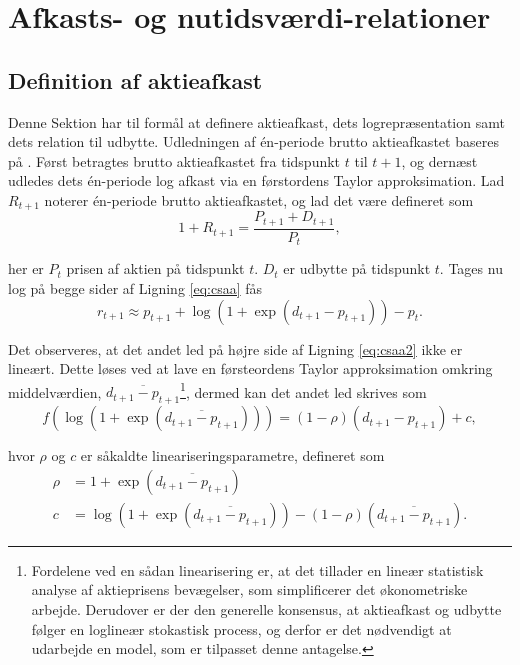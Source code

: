 \documentclass[
  a4paper,
  oneside]{memoir}
\begin{document}
\hypertarget{afkognut}{%
\section{Afkasts- og nutidsværdi-relationer}\label{afkognut}}

\hypertarget{defaktafk}{%
\subsection{Definition af aktieafkast}\label{defaktafk}}

Denne Sektion har til formål at definere aktieafkast, dets logrepræsentation samt dets relation til udbytte. Udledningen af én-periode brutto aktieafkastet baseres på \citep{Campbell1988}. Først betragtes brutto aktieafkastet fra tidspunkt \(t\) til \(t+1\), og dernæst udledes dets én-periode log afkast via en førstordens Taylor approksimation. Lad \(R_{t+1}\) noterer én-periode brutto aktieafkastet, og lad det være defineret som
\begin{equation}
1+R_{t+1}=\frac{P_{t+1}+D_{t+1}}{P_t}, \label{eq:csaa}
\end{equation}

her er \(P_t\) prisen af aktien på tidspunkt \(t\). \(D_t\) er udbytte på tidspunkt \(t\). Tages nu log på begge sider af Ligning \eqref{eq:csaa} fås
\begin{equation}
r_{t+1}\approx p_{t+1}+\log\left(1+\exp\left(d_{t+1}-p_{t+1}\right)\right)-p_t. \label{eq:csaa2}
\end{equation}

Det observeres, at det andet led på højre side af Ligning \eqref{eq:csaa2} ikke er lineært. Dette løses ved at lave en førsteordens Taylor approksimation omkring middelværdien, \(\overline{d_{t+1}-p_{t+1}}\)\footnote{Fordelene ved en sådan linearisering er, at det tillader en lineær statistisk analyse af aktieprisens bevægelser, som simplificerer det økonometriske arbejde. Derudover er der den generelle konsensus, at aktieafkast og udbytte følger en loglineær stokastisk process, og derfor er det nødvendigt at udarbejde en model, som er tilpasset denne antagelse.}, dermed kan det andet led skrives som
\begin{equation}
f\left(\log\left(1+\exp\left(\overline{d_{t+1}-p_{t+1}}\right)\right)\right) = (1-\rho)(d_{t+1}-p_{t+1}) + c, \label{eq:csaa3}
\end{equation}

hvor \(\rho\) og \(c\) er såkaldte lineariseringsparametre, defineret som
\begin{align*}
\rho&=1+\exp\left(\overline{d_{t+1}-p_{t+1}}\right)\\
c&=\log\left(1+\exp\left(\overline{d_{t+1}-p_{t+1}}\right)\right)-(1-\rho)(\overline{d_{t+1}-p_{t+1}}).
\end{align*}
\end{document}
